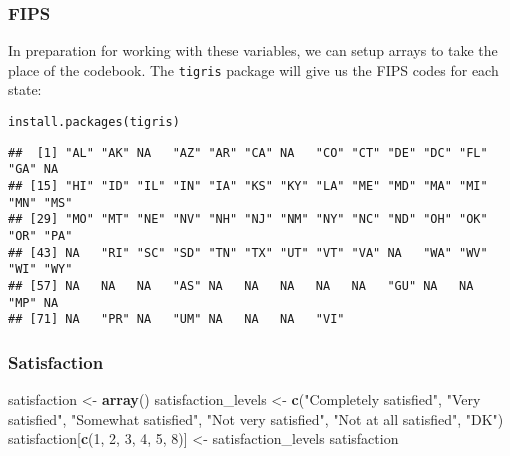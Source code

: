 \documentclass[]{book}
\newenvironment{Shaded}{\begin{snugshade}}{\end{snugshade}}
\newcommand{\KeywordTok}[1]{\textcolor[rgb]{0.13,0.29,0.53}{\textbf{{#1}}}}
\newcommand{\DataTypeTok}[1]{\textcolor[rgb]{0.13,0.29,0.53}{{#1}}}
\newcommand{\DecValTok}[1]{\textcolor[rgb]{0.00,0.00,0.81}{{#1}}}
\newcommand{\StringTok}[1]{\textcolor[rgb]{0.31,0.60,0.02}{{#1}}}
\newcommand{\NormalTok}[1]{{#1}}
\theoremstyle{definition}
\theoremstyle{definition}
\theoremstyle{remark}
\begin{document}
\subsubsection{FIPS}\label{fips}

In preparation for working with these variables, we can setup arrays to
take the place of the codebook. The \texttt{tigris} package will give us
the FIPS codes for each state:

\begin{verbatim}
install.packages(tigris)
\end{verbatim}

\begin{Shaded}
\end{Shaded}

\begin{verbatim}
##  [1] "AL" "AK" NA   "AZ" "AR" "CA" NA   "CO" "CT" "DE" "DC" "FL" "GA" NA  
## [15] "HI" "ID" "IL" "IN" "IA" "KS" "KY" "LA" "ME" "MD" "MA" "MI" "MN" "MS"
## [29] "MO" "MT" "NE" "NV" "NH" "NJ" "NM" "NY" "NC" "ND" "OH" "OK" "OR" "PA"
## [43] NA   "RI" "SC" "SD" "TN" "TX" "UT" "VT" "VA" NA   "WA" "WV" "WI" "WY"
## [57] NA   NA   NA   "AS" NA   NA   NA   NA   NA   "GU" NA   NA   "MP" NA  
## [71] NA   "PR" NA   "UM" NA   NA   NA   "VI"
\end{verbatim}

\subsubsection{Satisfaction}\label{satisfaction}

\begin{Shaded}
\begin{Highlighting}[]
\NormalTok{satisfaction <-}\StringTok{ }\KeywordTok{array}\NormalTok{()}
\NormalTok{satisfaction_levels <-}\StringTok{ }\KeywordTok{c}\NormalTok{(}\StringTok{"Completely satisfied"}\NormalTok{, }\StringTok{"Very satisfied"}\NormalTok{, }\StringTok{"Somewhat satisfied"}\NormalTok{, }\StringTok{"Not very satisfied"}\NormalTok{, }\StringTok{"Not at all satisfied"}\NormalTok{, }\StringTok{"DK"}\NormalTok{)}
\NormalTok{satisfaction[}\KeywordTok{c}\NormalTok{(}\DecValTok{1}\NormalTok{, }\DecValTok{2}\NormalTok{, }\DecValTok{3}\NormalTok{, }\DecValTok{4}\NormalTok{, }\DecValTok{5}\NormalTok{, }\DecValTok{8}\NormalTok{)] <-}\StringTok{ }\NormalTok{satisfaction_levels}
\NormalTok{satisfaction}
\end{Highlighting}
\end{Shaded}
\end{document}
